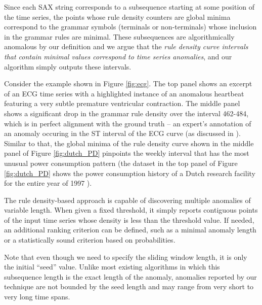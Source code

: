 \documentclass{sig-alternate}
\begin{document}
Since each SAX string corresponds to a subsequence starting at some position of the time series, the points whose rule density counters are global minima correspond to the grammar symbols (terminals or non-terminals) whose inclusion in the grammar rules are minimal. These subsequences are algorithmically anomalous by our definition and we argue that the \textit{rule density curve intervals that contain minimal values correspond to time series anomalies}, and our algorithm simply outputs these intervals.

Consider the example shown in Figure \ref{fig:ecg}. The top panel shows an excerpt of an ECG time series with a highlighted instance of an anomalous heartbeat featuring a very subtle premature ventricular contraction. The middle panel shows a significant drop in the grammar rule density over the interval 462-484, which is in perfect alignment with the ground truth -- an expert's annotation of an anomaly occuring in the ST interval of the ECG curve (as discussed in \cite{hot_sax}). Similar to that, the global minima of the rule density curve shown in the middle panel of Figure \ref{fig:dutch_PD} pinpoints the weekly interval that has the most unusual power consumption pattern (the dataset in the top panel of Figure \ref{fig:dutch_PD} shows the power consumption history of a Dutch research facility for the entire year of 1997 \cite{dutchpd}).

The rule density-based approach is capable of discovering multiple anomalies of variable length.  When given a fixed threshold, it simply reports contiguous points of the input time series whose density is less than the threshold value. If needed, an additional ranking criterion can be defined, such as a minimal anomaly length or a statistically sound criterion based on probabilities.

Note that even though we need to specify the sliding window length, it is only the initial ``seed'' value. Unlike most existing algorithms in which this subsequence length is the exact length of the anomaly, anomalies reported by our technique are not bounded by the seed length and may range from very short to very long time spans.
\end{document}

